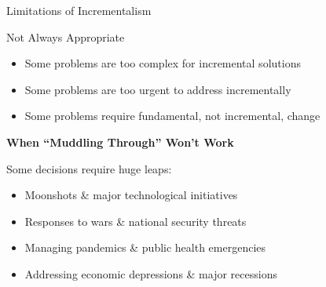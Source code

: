\documentclass[10pt]{beamer}
\begin{document}
\begin{frame}{Limitations of Incrementalism}
\begin{block}{Not Always Appropriate}
\begin{itemize}
\item Some problems are too complex for incremental solutions
\item Some problems are too urgent to address incrementally
\item Some problems require fundamental, not incremental, change
\end{itemize}
\end{block}

\vspace{0.5cm}
\textbf{When ``Muddling Through'' Won't Work}

Some decisions require huge leaps:
\begin{itemize}
\item Moonshots \& major technological initiatives
\item Responses to wars \& national security threats
\item Managing pandemics \& public health emergencies
\item Addressing economic depressions \& major recessions
\end{itemize}
\end{frame}
\end{document}
